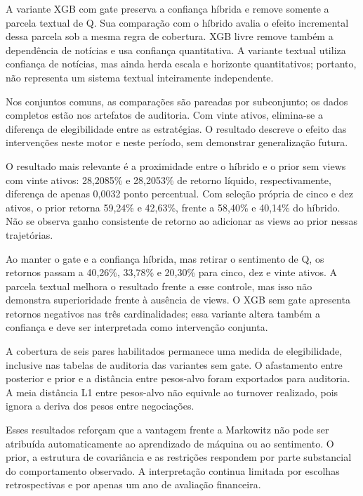 A variante XGB com gate preserva a confiança híbrida e remove somente a parcela textual de Q. Sua comparação com o híbrido avalia o efeito incremental dessa parcela sob a mesma regra de cobertura. XGB livre remove também a dependência de notícias e usa confiança quantitativa. A variante textual utiliza confiança de notícias, mas ainda herda escala e horizonte quantitativos; portanto, não representa um sistema textual inteiramente independente.

Nos conjuntos comuns, as comparações são pareadas por subconjunto; os dados completos estão nos artefatos de auditoria. Com vinte ativos, elimina-se a diferença de elegibilidade entre as estratégias. O resultado descreve o efeito das intervenções neste motor e neste período, sem demonstrar generalização futura.

O resultado mais relevante é a proximidade entre o híbrido e o prior sem views com vinte ativos: 28,2085\% e 28,2053\% de retorno líquido, respectivamente, diferença de apenas 0,0032 ponto percentual. Com seleção própria de cinco e dez ativos, o prior retorna 59,24\% e 42,63\%, frente a 58,40\% e 40,14\% do híbrido. Não se observa ganho consistente de retorno ao adicionar as views ao prior nessas trajetórias.

Ao manter o gate e a confiança híbrida, mas retirar o sentimento de Q, os retornos passam a 40,26\%, 33,78\% e 20,30\% para cinco, dez e vinte ativos. A parcela textual melhora o resultado frente a esse controle, mas isso não demonstra superioridade frente à ausência de views. O XGB sem gate apresenta retornos negativos nas três cardinalidades; essa variante altera também a confiança e deve ser interpretada como intervenção conjunta.

A cobertura de seis pares habilitados permanece uma medida de elegibilidade, inclusive nas tabelas de auditoria das variantes sem gate. O afastamento entre posterior e prior e a distância entre pesos-alvo foram exportados para auditoria. A meia distância L1 entre pesos-alvo não equivale ao turnover realizado, pois ignora a deriva dos pesos entre negociações.

Esses resultados reforçam que a vantagem frente a Markowitz não pode ser atribuída automaticamente ao aprendizado de máquina ou ao sentimento. O prior, a estrutura de covariância e as restrições respondem por parte substancial do comportamento observado. A interpretação continua limitada por escolhas retrospectivas e por apenas um ano de avaliação financeira.
